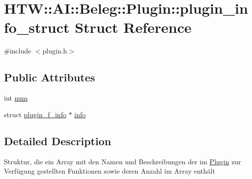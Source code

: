 \hypertarget{struct_h_t_w_1_1_a_i_1_1_beleg_1_1_plugin_1_1plugin__info__struct}{\section{H\-T\-W\-:\-:A\-I\-:\-:Beleg\-:\-:Plugin\-:\-:plugin\-\_\-info\-\_\-struct Struct Reference}
\label{struct_h_t_w_1_1_a_i_1_1_beleg_1_1_plugin_1_1plugin__info__struct}
}


{\ttfamily \#include $<$plugin.\-h$>$}

\subsection*{Public Attributes}
\begin{DoxyCompactItemize}
\item 
int \hyperlink{struct_h_t_w_1_1_a_i_1_1_beleg_1_1_plugin_1_1plugin__info__struct_a90069f082490ef14f554e6ea9ceb367d}{num}
\item 
struct \hyperlink{struct_h_t_w_1_1_a_i_1_1_beleg_1_1_plugin_1_1plugin__f__info}{plugin\-\_\-f\-\_\-info} $\ast$ \hyperlink{struct_h_t_w_1_1_a_i_1_1_beleg_1_1_plugin_1_1plugin__info__struct_af68df9f007dbfe37342d58627472b927}{info}
\end{DoxyCompactItemize}


\subsection{Detailed Description}
Struktur, die ein Array mit den Namen und Beschreibungen der im \hyperlink{namespace_h_t_w_1_1_a_i_1_1_beleg_1_1_plugin}{Plugin} zur Verfügung gestellten Funktionen sowie deren Anzahl im Array enthält 

